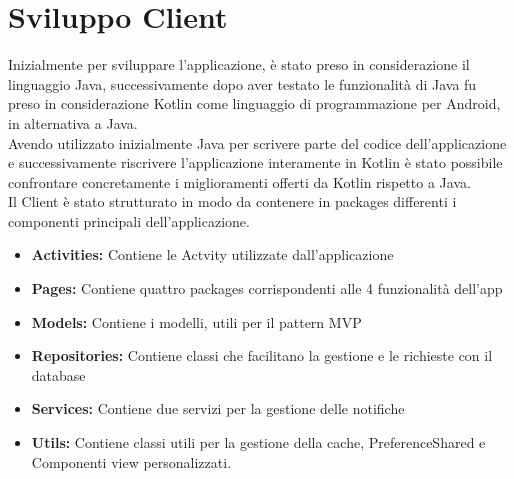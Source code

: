 \chapter{Sviluppo Client}                %
\lhead[\fancyplain{}{\bfseries\thepage}]{\fancyplain{}{\bfseries\rightmark}}

Inizialmente per sviluppare l'applicazione, è stato preso in considerazione il linguaggio Java, successivamente dopo aver testato le funzionalità di Java fu preso in considerazione Kotlin come linguaggio di programmazione per Android, in alternativa a Java.\\
Avendo utilizzato inizialmente Java per scrivere parte del codice dell'applicazione e successivamente riscrivere l'applicazione interamente in Kotlin è stato possibile confrontare concretamente i miglioramenti offerti da Kotlin rispetto a Java.\\
Il Client è stato strutturato in modo da contenere in packages differenti i componenti principali dell'applicazione.
\begin{itemize}
    \item \textbf{Activities:} Contiene le Actvity utilizzate dall'applicazione
    \item \textbf{Pages:} Contiene quattro packages corrispondenti alle 4 funzionalità dell'app
    \item \textbf{Models:} Contiene i modelli, utili per il pattern MVP
    \item \textbf{Repositories:} Contiene classi che facilitano la gestione e le richieste con il database
    \item \textbf{Services:} Contiene due servizi per la gestione delle notifiche
    \item \textbf{Utils:} Contiene classi utili per la gestione della cache, PreferenceShared e Componenti view personalizzati.
\end{itemize}

